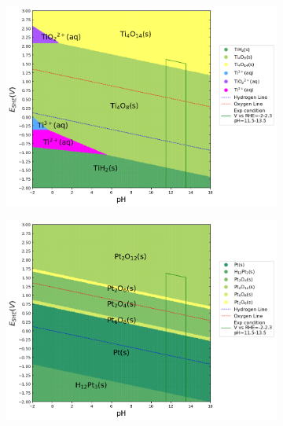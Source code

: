 \documentclass[journal=jacsat,manuscript=article]{achemso}
\begin{document}
\begin{figure}[htbp]
    \centering
    \begin{subfigure}[b]{0.45\textwidth}
        \subcaption{}\label{fig:Ti_Pourbaix_NH3_Gly_CN}
        \includegraphics[width=\textwidth]{Figures/pourbaix_diagrams/Ti-NH3-H2O_activity=1e-04_[NH3]=0.02M_[Gly]=0.005M_[CN]=0.0001.png}
        \par\medskip
    \end{subfigure}
    \begin{subfigure}[b]{0.45\textwidth}
        \subcaption{}\label{fig:Pt_Pourbaix_NH3_Gly_CN}
        \includegraphics[width=\textwidth]{Figures/pourbaix_diagrams/Pt-NH3-H2O_activity=1e-04_[NH3]=0.02M_[Gly]=0.005M_[CN]=0.0001.png}

\end{subfigure}
\end{figure}
\end{document}
